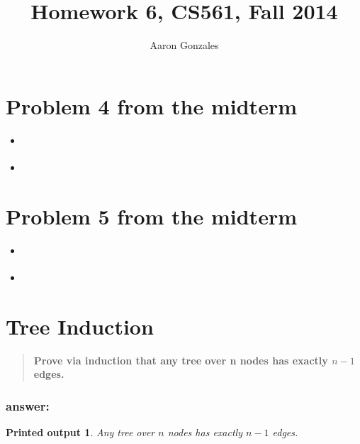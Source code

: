 \documentclass[titlepage]{article}\usepackage[]{graphicx}\usepackage[]{color}
\newtheorem{name}{Printed output}
\begin{document}
\title{Homework 6, CS561, Fall 2014}
\author{Aaron Gonzales}
\maketitle

\section{Problem 4 from the midterm}
\begin{quote}
  \textbf{}
\end{quote}

\begin{itemize}
  \item \textbf{}
  \item \textbf{ }
\end{itemize}

\section{Problem 5 from the midterm}
\begin{quote}
  \textbf{}
\end{quote}

\begin{itemize}
  \item \textbf{}
  \item \textbf{ }
\end{itemize}

\section{Tree Induction}
\begin{quote}
  \textbf{Prove via induction that any tree over n nodes has exactly $n-1$
  edges. }
\end{quote}

\subsubsection{answer:}

\newtheorem{mydef}{Theorem}

\begin{name}
  Any tree over $n$ nodes has exactly $n-1$ edges.
\end{name}
\end{document}
